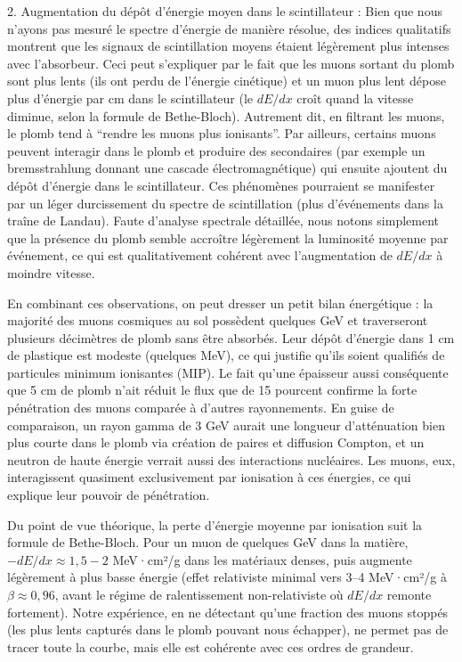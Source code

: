 \documentclass[a4paper,12pt,twoside]{article}
\begin{document}
2.	Augmentation du dépôt d’énergie moyen dans le scintillateur : Bien que nous n’ayons pas mesuré le spectre d’énergie de manière résolue, des indices qualitatifs montrent que les signaux de scintillation moyens étaient légèrement plus intenses avec l’absorbeur. Ceci peut s’expliquer par le fait que les muons sortant du plomb sont plus lents (ils ont perdu de l’énergie cinétique) et un muon plus lent dépose plus d’énergie par cm dans le scintillateur (le $dE/dx$ croît quand la vitesse diminue, selon la formule de Bethe-Bloch). Autrement dit, en filtrant les muons, le plomb tend à “rendre les muons plus ionisants”. Par ailleurs, certains muons peuvent interagir dans le plomb et produire des secondaires (par exemple un bremsstrahlung donnant une cascade électromagnétique) qui ensuite ajoutent du dépôt d’énergie dans le scintillateur. Ces phénomènes pourraient se manifester par un léger durcissement du spectre de scintillation (plus d’événements dans la traîne de Landau). Faute d’analyse spectrale détaillée, nous notons simplement que la présence du plomb semble accroître légèrement la luminosité moyenne par événement, ce qui est qualitativement cohérent avec l’augmentation de $dE/dx$ à moindre vitesse.

En combinant ces observations, on peut dresser un petit bilan énergétique : la majorité des muons cosmiques au sol possèdent quelques GeV et traverseront plusieurs décimètres de plomb sans être absorbés. Leur dépôt d’énergie dans 1 cm de plastique est modeste (quelques MeV), ce qui justifie qu’ils soient qualifiés de particules minimum ionisantes (MIP). Le fait qu’une épaisseur aussi conséquente que 5 cm de plomb n’ait réduit le flux que de 15 pourcent confirme la forte pénétration des muons comparée à d’autres rayonnements. En guise de comparaison, un rayon gamma de 3 GeV aurait une longueur d’atténuation bien plus courte dans le plomb via création de paires et diffusion Compton, et un neutron de haute énergie verrait aussi des interactions nucléaires. Les muons, eux, interagissent quasiment exclusivement par ionisation à ces énergies, ce qui explique leur pouvoir de pénétration.

Du point de vue théorique, la perte d’énergie moyenne par ionisation suit la formule de Bethe-Bloch. Pour un muon de quelques GeV dans la matière, $-dE/dx \approx 1,5-2$ MeV·cm²/g dans les matériaux denses, puis augmente légèrement à plus basse énergie (effet relativiste minimal vers 3–4 MeV·cm²/g à $\beta \approx 0,96$, avant le régime de ralentissement non-relativiste où $dE/dx$ remonte fortement). Notre expérience, en ne détectant qu’une fraction des muons stoppés (les plus lents capturés dans le plomb pouvant nous échapper), ne permet pas de tracer toute la courbe, mais elle est cohérente avec ces ordres de grandeur.
\end{document}
